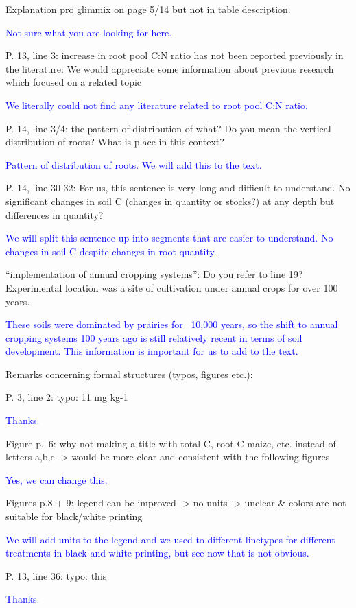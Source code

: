 \documentclass[]{article}
\begin{document}
Explanation pro glimmix on page 5/14 but not in table description.

\textcolor{blue}{Not sure what you are looking for here.}

P. 13, line 3: increase in root pool C:N ratio has not been reported
previously in the literature: We would appreciate some information about
previous research which focused on a related topic

\textcolor{blue}{We literally could not find any literature related to root pool C:N ratio.}

P. 14, line 3/4: the pattern of distribution of what? Do you mean the
vertical distribution of roots? What is place in this context?

\textcolor{blue}{Pattern of distribution of roots. We will add this to the text.}

P. 14, line 30-32: For us, this sentence is very long and difficult to
understand. No significant changes in soil C (changes in quantity or
stocks?) at any depth but differences in quantity?

\textcolor{blue}{We will split this sentence up into segments that are easier to understand. No changes in soil C despite changes in root quantity.}

``implementation of annual cropping systems'': Do you refer to line 19?
Experimental location was a site of cultivation under annual crops for
over 100 years.

\textcolor{blue}{These soils were dominated by prairies for ~10,000 years, so the shift to annual cropping systems 100 years ago is still relatively recent in terms of soil development. This information is important for us to add to the text.}

Remarks concerning formal structures (typos, figures etc.):

P. 3, line 2: typo: 11 mg kg-1

\textcolor{blue}{Thanks.}

Figure p.~6: why not making a title with total C, root C maize, etc.
instead of letters a,b,c -\textgreater{} would be more clear and
consistent with the following figures

\textcolor{blue}{Yes, we can change this.}

Figures p.8 + 9: legend can be improved -\textgreater{} no units
-\textgreater{} unclear \& colors are not suitable for black/white
printing

\textcolor{blue}{We will add units to the legend and we used to different linetypes for different treatments in black and white printing, but see now that is not obvious.}

P. 13, line 36: typo: this

\textcolor{blue}{Thanks.}
\end{document}
